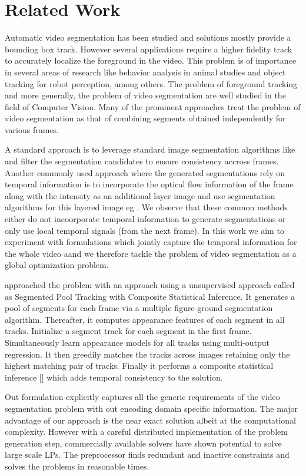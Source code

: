 \section{Related Work}

Automatic video segmentation has been studied and solutions mostly provide a 
bounding box track. However several applications require a higher fidelity 
track to accurately localize the foreground in the video. This problem is of 
importance in several areas of research like behavior analysis in animal studies and object tracking for robot perception, among others.  The problem of foreground tracking and more generally, the problem of video segmentation are well studied in the field of Computer Vision. Many of the prominent approaches treat the problem of video segmentation as that of combining segments obtained independently for various frames. 

A standard approach is to leverage standard image segmentation algorithms like \cite{CPMC} and filter the segmentation candidates to ensure consistency accross frames. Another commonly used approach where the generated segmentations rely on temporal information is to incorporate the optical flow information of the frame along with the intensity as an additional layer image and use segmentation algorithms for this layered image eg \cite{LeordeanuSS12}. We observe that these common methods either do not incoorporate temporal information to generate segmentations or only use local temporal signals (from the next frame). In this work we aim to experiment with formulations which jointly capture the temporal information for the whole video aand we therefore tackle the problem of video segmentation as a global optimization problem.

\cite{li2013video} approached the problem with an approach using a unsupervised
approach called as Segmented Pool Tracking with Composite Statistical Inference.
It generates a pool of segments for each frame via a multiple figure-ground segmentation algorithm. Thereafter, it computes appearance features of each segment in all tracks. Initialize a segment track for each segment in the first frame. Simultaneously learn appearance models for all tracks using multi-output regression. 
It then greedily matches the tracks across images retaining only the highest matching pair of tracks. Finally it performs a composite statistical inference [\cite{li2013Composite}] which adds temporal consistency to the solution.

Out formulation explicitly captures all the generic requirements of the video
 segmentation problem with out encoding domain specific information. The major 
 advantage of our approach is the near exact solution albeit at the computational complexity. However with a careful distributed implementation of the problem
  generation step, commercially available solvers have shown potential to solve
  large scale LPs. The preprocessor finds redundant and inactive constraints and 
  solves the problems in reasonable times. 
